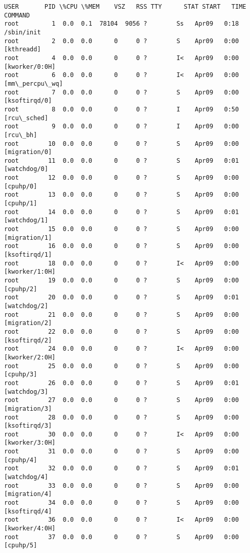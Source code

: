\documentclass[11pt]{article}
\begin{document}
    \begin{Verbatim}[commandchars=\\\{\}]
USER       PID \%CPU \%MEM    VSZ   RSS TTY      STAT START   TIME COMMAND
root         1  0.0  0.1  78104  9056 ?        Ss   Apr09   0:18 /sbin/init
root         2  0.0  0.0      0     0 ?        S    Apr09   0:00 [kthreadd]
root         4  0.0  0.0      0     0 ?        I<   Apr09   0:00 [kworker/0:0H]
root         6  0.0  0.0      0     0 ?        I<   Apr09   0:00 [mm\_percpu\_wq]
root         7  0.0  0.0      0     0 ?        S    Apr09   0:00 [ksoftirqd/0]
root         8  0.0  0.0      0     0 ?        I    Apr09   0:50 [rcu\_sched]
root         9  0.0  0.0      0     0 ?        I    Apr09   0:00 [rcu\_bh]
root        10  0.0  0.0      0     0 ?        S    Apr09   0:00 [migration/0]
root        11  0.0  0.0      0     0 ?        S    Apr09   0:01 [watchdog/0]
root        12  0.0  0.0      0     0 ?        S    Apr09   0:00 [cpuhp/0]
root        13  0.0  0.0      0     0 ?        S    Apr09   0:00 [cpuhp/1]
root        14  0.0  0.0      0     0 ?        S    Apr09   0:01 [watchdog/1]
root        15  0.0  0.0      0     0 ?        S    Apr09   0:00 [migration/1]
root        16  0.0  0.0      0     0 ?        S    Apr09   0:00 [ksoftirqd/1]
root        18  0.0  0.0      0     0 ?        I<   Apr09   0:00 [kworker/1:0H]
root        19  0.0  0.0      0     0 ?        S    Apr09   0:00 [cpuhp/2]
root        20  0.0  0.0      0     0 ?        S    Apr09   0:01 [watchdog/2]
root        21  0.0  0.0      0     0 ?        S    Apr09   0:00 [migration/2]
root        22  0.0  0.0      0     0 ?        S    Apr09   0:00 [ksoftirqd/2]
root        24  0.0  0.0      0     0 ?        I<   Apr09   0:00 [kworker/2:0H]
root        25  0.0  0.0      0     0 ?        S    Apr09   0:00 [cpuhp/3]
root        26  0.0  0.0      0     0 ?        S    Apr09   0:01 [watchdog/3]
root        27  0.0  0.0      0     0 ?        S    Apr09   0:00 [migration/3]
root        28  0.0  0.0      0     0 ?        S    Apr09   0:00 [ksoftirqd/3]
root        30  0.0  0.0      0     0 ?        I<   Apr09   0:00 [kworker/3:0H]
root        31  0.0  0.0      0     0 ?        S    Apr09   0:00 [cpuhp/4]
root        32  0.0  0.0      0     0 ?        S    Apr09   0:01 [watchdog/4]
root        33  0.0  0.0      0     0 ?        S    Apr09   0:00 [migration/4]
root        34  0.0  0.0      0     0 ?        S    Apr09   0:00 [ksoftirqd/4]
root        36  0.0  0.0      0     0 ?        I<   Apr09   0:00 [kworker/4:0H]
root        37  0.0  0.0      0     0 ?        S    Apr09   0:00 [cpuhp/5]

\end{Verbatim}
\end{document}
